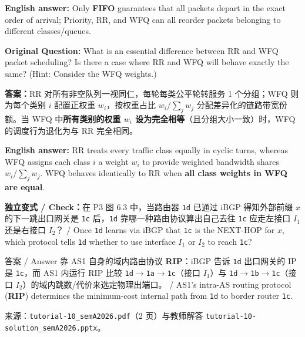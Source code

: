 \textbf{English answer:} Only \textbf{FIFO} guarantees that all packets depart in the exact order of arrival; Priority, RR, and WFQ can all reorder packets belonging to different classes/queues.



\textbf{Original Question:} What is an essential difference between RR and WFQ packet scheduling? Is there a case where RR and WFQ will behave exactly the same? (Hint: Consider the WFQ weights.)

\textbf{答案：}RR 对所有非空队列一视同仁，每轮每类公平轮转服务 1 个分组；WFQ 则为每个类别 $i$ 配置正权重 $w_i$，按权重占比 $w_i / \sum_j w_j$ 分配差异化的链路带宽份额。当 WFQ 中\textbf{所有类别的权重 $w_i$ 设为完全相等}（且分组大小一致）时，WFQ 的调度行为退化为与 RR 完全相同。

\textbf{English answer:} RR treats every traffic class equally in cyclic turns, whereas WFQ assigns each class $i$ a weight $w_i$ to provide weighted bandwidth shares $w_i/\sum_j w_j$. WFQ behaves identically to RR when \textbf{all class weights in WFQ are equal}.

\textbf{独立变式 / Check：}在 P3 图 6.3 中，当路由器 \texttt{1d} 已通过 iBGP 得知外部前缀 $x$ 的下一跳出口网关是 \texttt{1c} 后，\texttt{1d} 靠哪一种路由协议算出自己去往 \texttt{1c} 应走左接口 $I_1$ 还是右接口 $I_2$？ / Once \texttt{1d} learns via iBGP that \texttt{1c} is the NEXT-HOP for $x$, which protocol tells \texttt{1d} whether to use interface $I_1$ or $I_2$ to reach \texttt{1c}?

\begin{StudySolution}{答案 / Answer}
靠 AS1 自身的域内路由协议 \textbf{RIP}：iBGP 告诉 \texttt{1d} 出口网关的 IP 是 \texttt{1c}，而 AS1 内运行 RIP 比较 \texttt{1d}$\to$\texttt{1a}$\to$\texttt{1c}（接口 $I_1$）与 \texttt{1d}$\to$\texttt{1b}$\to$\texttt{1c}（接口 $I_2$）的域内跳数/代价来选定物理出端口。 / AS1's intra-AS routing protocol (\textbf{RIP}) determines the minimum-cost internal path from \texttt{1d} to border router \texttt{1c}.
\end{StudySolution}

来源：\texttt{tutorial-10\_semA2026.pdf}（2 页）与教师解答 \texttt{tutorial-10-solution\_semA2026.pptx}。
